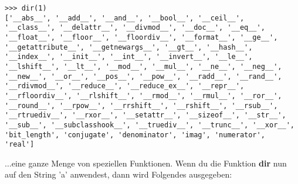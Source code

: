 \begin{Verbatim}[frame=single]
>>> dir(1)
['__abs__', '__add__', '__and__', '__bool__', '__ceil__',
'__class__', '__delattr__', '__divmod__', '__doc__', '__eq__',
'__float__', '__floor__', '__floordiv__', '__format__', '__ge__',
'__getattribute__', '__getnewargs__', '__gt__', '__hash__',
'__index__', '__init__', '__int__', '__invert__', '__le__',
'__lshift__', '__lt__', '__mod__', '__mul__', '__ne__', '__neg__',
'__new__', '__or__', '__pos__', '__pow__', '__radd__', '__rand__',
'__rdivmod__', '__reduce__', '__reduce_ex__', '__repr__',
'__rfloordiv__', '__rlshift__', '__rmod__', '__rmul__', '__ror__',
'__round__', '__rpow__', '__rrshift__', '__rshift__', '__rsub__',
'__rtruediv__', '__rxor__', '__setattr__', '__sizeof__', '__str__',
'__sub__', '__subclasshook__', '__truediv__', '__trunc__', '__xor__',
'bit_length', 'conjugate', 'denominator', 'imag', 'numerator',
'real']
\end{Verbatim}

\texorpdfstring{$\ldots$}{...}eine ganze Menge von speziellen Funktionen. Wenn du die Funktion \textbf{dir} nun auf den String 'a' anwendest, dann wird Folgendes ausgegeben:

